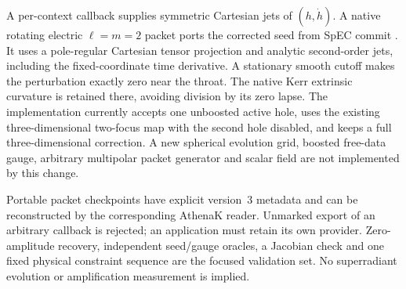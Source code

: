 \documentclass[aps,prd,preprint,notitlepage,nofootinbib]{revtex4-2}
\begin{document}
A per-context callback supplies symmetric Cartesian jets of $(h,\dot h)$.
A native rotating electric $\ell=m=2$ packet ports the corrected seed from
SpEC commit .
It uses a pole-regular Cartesian tensor projection and analytic second-order
jets, including the fixed-coordinate time derivative. A stationary smooth
cutoff makes the perturbation exactly zero near the throat. The native Kerr
extrinsic curvature is retained there, avoiding division by its zero lapse.
The implementation currently accepts one unboosted active hole, uses the
existing three-dimensional two-focus map with the second hole disabled, and
keeps a full three-dimensional correction. A new spherical evolution grid,
boosted free-data gauge, arbitrary multipolar packet generator and scalar
field are not implemented by this change.

Portable packet checkpoints have explicit version~3 metadata and can be
reconstructed by the corresponding AthenaK reader. Unmarked export of an
arbitrary callback is rejected; an application must retain its own provider.
Zero-amplitude recovery, independent seed/gauge oracles, a Jacobian check and
one fixed physical constraint sequence are the focused validation set.
No superradiant evolution or amplification measurement is implied.
\end{document}
